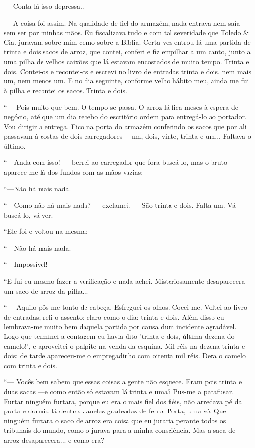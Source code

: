 --- Conta lá isso depressa...

--- A coisa foi assim. Na qualidade de fiel do armazém, nada entrava nem
saía sem ser por minhas mãos. Eu fiscalizava tudo e com tal severidade
que Toledo \& Cia. juravam sobre mim como sobre a Bíblia. Certa vez
entrou lá uma partida de trinta e dois sacos de arroz, que contei,
conferi e fiz empilhar a um canto, junto a uma pilha de velhos caixões
que lá estavam encostados de muito tempo. Trinta e dois. Contei-os e
recontei-os e escrevi no livro de entradas trinta e dois, nem mais um,
nem menos um. E no dia seguinte, conforme velho hábito meu, ainda me fui
à pilha e recontei os sacos. Trinta e dois.

``--- Pois muito que bem. O tempo se passa. O arroz lá fica meses à
espera de negócio, até que um dia recebo do escritório ordem para
entregá-lo ao portador. Vou dirigir a entrega. Fico na porta do armazém
conferindo os sacos que por ali passavam à costas de dois carregadores
---um, dois, vinte, trinta e um... Faltava o último.

``---Anda com isso! --- berrei ao carregador que fora buscá-lo, mas o
bruto aparece-me lá dos fundos com as mãos vazias:

``---Não há mais nada.

``---Como não há mais nada? --- exclamei. --- São trinta e dois. Falta
um. Vá buscá-lo, vá ver.

``Ele foi e voltou na mesma:

``---Não há mais nada.

``---Impossível!

``E fui eu mesmo fazer a verificação e nada achei. Misteriosamente
desaparecera um saco de arroz da pilha...

``--- Aquilo pôs-me tonto de cabeça. Esfreguei os olhos. Cocei-me.
Voltei ao livro de entradas; reli o assento; claro como o dia: trinta e
dois. Além disso eu lembrava-me muito bem daquela partida por causa dum
incidente agradável. Logo que terminei a contagem eu havia dito `trinta
e dois, última dezena do camelo!', e aproveitei o palpite na venda da
esquina. Mil réis na dezena trinta e dois: de tarde apareceu-me o
empregadinho com oitenta mil réis. Dera o camelo com trinta e dois.

``--- Vocês bem sabem que essas coisas a gente não esquece. Eram pois
trinta e duas sacas ---e como então só estavam lá trinta e uma? Pus-me a
parafusar. Furtar ninguém furtara, porque eu era o mais fiel dos fiéis,
não arredava pé da porta e dormia lá dentro. Janelas gradeadas de ferro.
Porta, uma só. Que ninguém furtara o saco de arroz era coisa que eu
juraria perante todos os tribunais do mundo, como o jurava para a minha
consciência. Mas a saca de arroz desaparecera... e como era?

